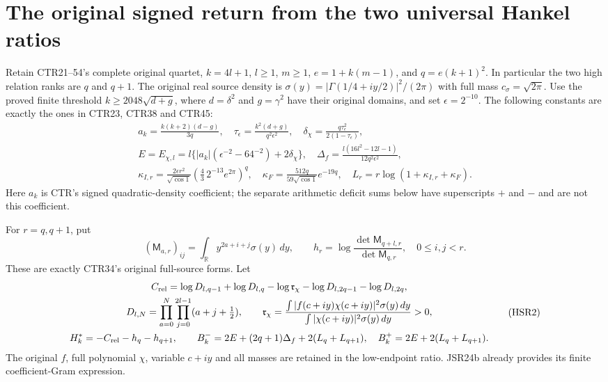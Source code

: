 \section{The original signed return from the two universal Hankel ratios}

Retain CTR21--54's complete original quartet, $k=4l+1$,
$l\geq1$, $m\geq1$, $e=1+k(m-1)$, and
$q=e(k+1)^2$. In particular the two high relation ranks
are $q$ and $q+1$. The original real source density is
$\sigma(y)=|\Gamma(1/4+iy/2)|^2/(2\pi)$ with full mass
$c_\sigma=\sqrt{2\pi}$. Use the proved finite threshold
$k\geq2048\sqrt{d+g}$, where $d=\delta^2$ and $g=\gamma^2$
have their original domains, and set $\epsilon=2^{-10}$.
The following constants are exactly the ones in CTR23,
CTR38 and CTR45:
\[
\begin{gathered}
 a_k=\frac{k(k+2)(d-g)}{3q},\quad
 \tau_\epsilon=\frac{k^2(d+g)}{q^2\epsilon^2},\quad
 \delta_\chi=\frac{q\tau_\epsilon^2}{2(1-\tau_\epsilon)},\\
 E=E_{\chi,l}=l\{|a_k|(\epsilon^{-2}-64^{-2})+2\delta_\chi\},\quad
 \Delta_f=\frac{l(16l^2-12l-1)}{12q^2\epsilon^2},\\
 \kappa_{I,r}=\frac{2\epsilon r^2}{\sqrt{\cos1}}
     \left(\frac43\,2^{-13}e^{2\pi}\right)^q,\quad
 \kappa_F=\frac{512q}{59\sqrt{\cos1}}e^{-19q},\quad
 L_r=r\log(1+\kappa_{I,r}+\kappa_F).
\end{gathered}\tag{HSR1}
\]
Here $a_k$ is CTR's signed quadratic-density coefficient;
the separate arithmetic deficit sums below have superscripts
$+$ and $-$ and are not this coefficient.

For $r=q,q+1$, put
\[
 (\mathsf M_{a,r})_{ij}=\int_{\mathbb R}y^{2a+i+j}\sigma(y)\,dy,
 \qquad
 h_r=\log\frac{\det\mathsf M_{q+l,r}}{\det\mathsf M_{q,r}},
 \quad 0\leq i,j<r.
\]
These are exactly CTR34's original full-source forms. Let
\[
\begin{gathered}
 C_{\rm rel}=\log D_{l,q-1}+\log D_{l,q}-\log\mathfrak r_\chi
                         -\log D_{l,2q-1}-\log D_{l,2q},\\
 D_{l,N}=\prod_{a=0}^{N}\prod_{j=0}^{2l-1}(a+j+\tfrac12),\qquad
 \mathfrak r_\chi=\frac{\int|f(c+iy)\chi(c+iy)|^2\sigma(y)\,dy}
                         {\int|\chi(c+iy)|^2\sigma(y)\,dy}>0,\\
 H_k^*=-C_{\rm rel}-h_q-h_{q+1},\qquad
 B_k^-=2E+(2q+1)\Delta_f+2(L_q+L_{q+1}),\quad
 B_k^+=2E+2(L_q+L_{q+1}).
\end{gathered}\tag{HSR2}
\]
The original $f$, full polynomial $\chi$, variable $c+iy$ and
all masses are retained in the low-endpoint ratio. JSR24b
already provides its finite coefficient-Gram expression.

